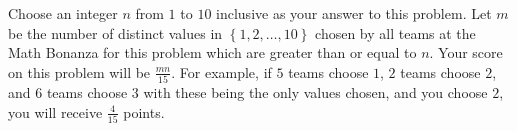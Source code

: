 Choose an integer $n$ from $1$ to $10$ inclusive as your answer to this problem. Let $m$ be the number of distinct values in $\left\{1,2,\ldots,10\right\}$ chosen by all teams at the Math Bonanza for this problem which are greater than or equal to $n$. Your score on this problem will be $\frac{mn}{15}$. For example, if $5$ teams choose $1$, $2$ teams choose $2$, and $6$ teams choose $3$ with these being the only values chosen, and you choose $2$, you will receive $\frac{4}{15}$ points.